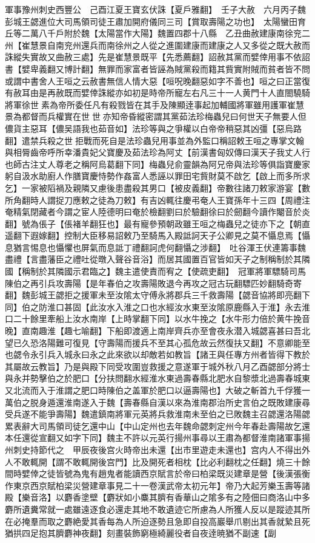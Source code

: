 軍事豫州刺史西豐公　己酉江夏王寶玄伏誅【夏戶雅翻】　壬子大赦　六月丙子魏彭城王勰進位大司馬領司徒王肅加開府儀同三司【賞取壽陽之功也】　太陽蠻田育丘等二萬八千戶附於魏【太陽當作大陽】魏置四郡十八縣　乙丑曲赦建康南徐兖二州【崔慧景自南兖州還兵而南徐州之人從之進圍建康而建康之人又多從之既大赦而誅縱失實故又曲赦三處】先是崔慧景既平【先悉薦翻】詔赦其黨而嬖倖用事不依詔書【嬖卑義翻又博計翻】無罪而家富者皆誣為賊黨殺而籍其貲實附賊而貧者皆不問或謂中書舍人王咺之云赦書無信人情大惡【咺呪晚翻惡如字不善也】咺之曰正當復有赦耳由是再赦既而嬖倖誅縱亦如初是時帝所寵左右凡三十一人黄門十人直閤驍騎將軍徐世素為帝所委任凡有殺戮皆在其手及陳顯逹事起加輔國將軍雖用護軍崔慧景為都督而兵權實在世世亦知帝昏縱密謂其黨茹法珍梅蟲兒曰何世天子無要人但儂貨主惡耳【儂吴語我也茹音如】法珍等與之爭權以白帝帝稍惡其凶彊【惡烏路翻】遣禁兵殺之世拒戰而死自是法珍蟲兒用事並為外監口稱詔敕王咺之專掌文翰與相脣齒帝呼所幸潘貴妃父寶慶及茹法珍為阿丈【前漢書匈奴傳曰漢天子我丈人行也師古注丈人尊老之稱阿烏葛翻下同】梅蟲兒俞靈韻為阿兄帝與法珍等俱詣寶慶家躬自汲水助廚人作膳寶慶恃勢作姦富人悉誣以罪田宅貲財莫不啟乞【啟上而多所求乞】一家被䧟禍及親隣又慮後患盡殺其男口【被皮義翻】帝數往諸刀敕家游宴【數所角翻時人謂捉刀應敕之徒為刀敕】有吉凶輒往慶弔奄人王寶孫年十三四【周禮注奄精氣閉藏者今謂之宦人陸德明曰奄於檢翻劉曰於驗翻徐曰於劒翻今讀作閹音於炎翻】號為倀子【倀褚羊翻狂也】最有寵參預朝政雖王咺之梅蟲兒之徒亦下之【朝直遥翻下遐嫁翻】控制大臣移易詔敕乃至騎馬入殿詆訶天子公卿見之莫不懾息焉【懾息猶言惕息也懾懼也屏氣而息詆丁禮翻訶虎何翻懾之涉翻】　吐谷渾王伏連籌事魏盡禮【言盡藩臣之禮吐從暾入聲谷音浴】而居其國置百官皆如天子之制稱制於其隣國【稱制於其隣國示君臨之】魏主遣使責而宥之【使疏吏翻】　冠軍將軍驃騎司馬陳伯之再引兵攻壽陽【是年春伯之攻壽陽敗退今再攻之冠古玩翻驃匹妙翻騎奇寄翻】魏彭城王勰拒之援軍未至汝隂太守傅永將郡兵三千救壽陽【勰音協將即亮翻下同】伯之防淮口甚固【此汝水入淮之口也水經汝水東至汝隂原鹿縣入于淮】永去淮口二十餘里牽船上汝水南岸【上時掌翻下同】以水牛挽之【水牛形力倍於黄牛挽音晚】直南趣淮【趣七喻翻】下船即渡適上南岸齊兵亦至會夜永潜入城勰喜甚曰吾北望已久恐洛陽難可復見【守壽陽而援兵不至其心孤危故云然復扶又翻】不意卿能至也勰令永引兵入城永曰永之此來欲以却敵若如教旨【諸王與任專方州者皆得下教於其屬故云教旨】乃是與殿下同受攻圍豈救援之意遂軍于城外秋八月乙酉勰部分將士與永并勢擊伯之於肥口【分扶問翻水經淮水東過壽春縣北肥水自黎漿北過壽春城東又北流而入于淮謂之肥口時陳伯之盖軍於肥口以逼壽陽也】大破之斬首九千俘獲一萬伯之脱身遁還淮南遂入于魏【壽春縣自漢以來為淮南郡治所史言伯之既敗建康尋受兵遂不能爭壽陽】魏遣鎮南將軍元英將兵救淮南未至伯之已敗魏主召勰還洛陽勰累表辭大司馬領司徒乞還中山【中山定州也去年魏命勰刺定州今年春赴壽陽故乞還本任還從宣翻又如字下同】魏主不許以元英行揚州事尋以王肅為都督淮南諸軍事揚州刺史持節代之　甲辰夜後宫火時帝出未還【出市里遊走未還也】宫内人不得出外人不敢輒開【謂不敢輒開後宫門】比及開死者相枕【比必利翻枕之任翻】燒三十餘間時嬖倖之徒皆號為鬼有趙鬼者能讀西京賦言於帝曰柏梁既災建章是營【後漢張衡作東京西京賦柏梁災營建章事見二十一卷漢武帝太初元年】帝乃大起芳樂玉壽等諸殿【樂音洛】以麝香塗壁【麝狀如小麋其臍有香華山之隂多有之陸佃曰商洛山中多麝所遺糞常就一處雖遠逐食必還走其地不敢遺迹它所慮為人所獲人反以是蹤迹其所在必掩羣而取之麝絶愛其香每為人所迫逐勢且急即自投高巖舉爪剔出其香就縶且死猶拱四足抱其臍麝神夜翻】刻畫裝飾窮極綺麗役者自夜逹暁猶不副速【副
